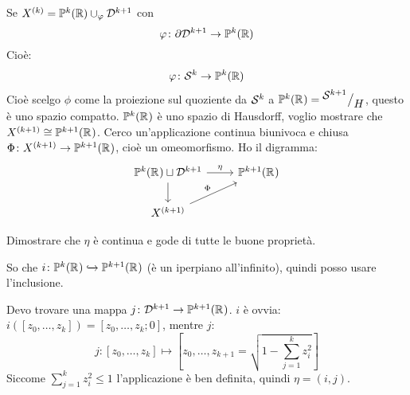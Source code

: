 \begin{example}
  Se $ X^{(k)} = \mathbb{P}^{k} (\mathbb{R}) \cup_\varphi \mathcal{D}^{k+1} $ con
  \[
    \varphi \colon \partial \mathcal{D}^{k+1}  \to \mathbb{P}^{k} (\mathbb{R})
  \]
  Cioè:
  \[
    \varphi \colon \mathcal{S}^{k}  \to \mathbb{P}^{k} (\mathbb{R})
  \]
  Cioè scelgo $ \phi $ come la proiezione sul quoziente da $ \mathcal{S}^{k} $ a $ \mathbb{P}^k(\mathbb{R}^{}) = {^{\textstyle \mathcal{S}^{k+1}}\big/_{\textstyle H}} $,
  questo è uno spazio compatto.
  $ \mathbb{P}^k(\mathbb{R}^{}) $ è uno spazio di Hausdorff, voglio mostrare che $ X^{(k+1)} \cong \mathbb{P}^{k+1}(\mathbb{R}^{}) $.
  Cerco un'applicazione continua biunivoca e chiusa $ \Phi \colon X^{(k+1)} \to  \mathbb{P}^{k+1}(\mathbb{R}^{}) $,
  cioè un omeomorfismo. Ho il digramma:
  \[
    \begin{tikzcd}
      \mathbb{P}^{k}(\RN{}) \sqcup \Disk{k+1} \arrow{r}{\eta} \arrow{d}{} &  \mathbb{P}^{k+1}(\RN{}) \\
      X^{(k+1)} \arrow{ru}{\Phi}
    \end{tikzcd}
  \]
  \begin{exercise}
    Dimostrare che $ \eta $ è continua e gode di tutte le buone proprietà.
  \end{exercise}
  So che $ i \colon  \mathbb{P}^{k}(\mathbb{R}^{}) \xhookrightarrow{} \mathbb{P}^{k+1}(\mathbb{R}^{}) $ (è un iperpiano all'infinito),
  quindi posso usare l'inclusione.

  Devo trovare una mappa $ j \colon \mathcal{D}^{k+1} \to \mathbb{P}^{k+1}(\mathbb{R}^{}) $. $ i $ è ovvia:
  $ i([z_0, \dots, z_k]) = [z_0, \dots, z_k; 0] $, mentre $ j $:
  \[
    j \colon [z_0, \dots, z_k] \mapsto  \left[z_0, \dots, z_{k+1} = \sqrt{1 - \sum_{j=1}^k z_i^2}\right]
  \]
  Siccome $ \sum_{j=1}^k z_i^2 \leq 1 $ l'applicazione è ben definita, quindi $ \eta = (i,j) $.
\end{example}

